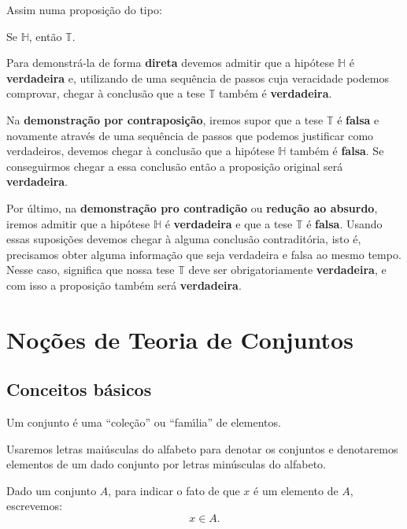 Assim numa proposi\c{c}\~ao do tipo:
\begin{center}
	Se $\mathbb{H}$, ent\~ao $\mathbb{T}$.
\end{center}

Para demonstr\'a-la de forma \textbf{direta} devemos admitir que a hip\'otese $\mathbb{H}$ \'e \textbf{verdadeira} e, utilizando de uma sequ\^encia de passos
cuja veracidade podemos comprovar, chegar \`a conclus\~ao que a tese $\mathbb{T}$ tamb\'em \'e \textbf{verdadeira}.

Na \textbf{demonstra\c{c}\~ao por contraposi\c{c}\~ao}, iremos supor que a tese $\mathbb{T}$ \'e \textbf{falsa} e novamente atrav\'es de uma
sequ\^encia de passos que podemos justificar como verdadeiros, devemos chegar \`a conclus\~ao que a hip\'otese $\mathbb{H}$ tamb\'em \'e
\textbf{falsa}. Se conseguirmos chegar a essa conclus\~ao ent\~ao a proposi\c{c}\~ao original ser\'a \textbf{verdadeira}.

Por \'ultimo, na \textbf{demonstra\c{c}\~ao pro contradi\c{c}\~ao} ou \textbf{redu\c{c}\~ao ao absurdo}, iremos admitir que a hip\'otese
$\mathbb{H}$ \'e \textbf{verdadeira} e que a tese $\mathbb{T}$ \'e \textbf{falsa}. Usando essas suposi\c{c}\~oes devemos chegar \`a alguma
conclus\~ao contradit\'oria, isto \'e, precisamos obter alguma informa\c{c}\~ao que seja verdadeira e falsa ao mesmo tempo. Nesse caso,
significa que nossa tese $\mathbb{T}$ deve ser obrigatoriamente \textbf{verdadeira}, e com isso a proposi\c{c}\~ao tamb\'em ser\'a
\textbf{verdadeira}.



\chapter{No{\c c}{\~o}es de Teoria de Conjuntos}
\section{Conceitos b{\'a}sicos}

Um conjunto {\'e} uma ``cole{\c c}{\~a}o'' ou ``fam{\'\i}lia'' de elementos.

Usaremos letras mai{\'u}sculas do alfabeto para denotar os conjuntos e denotaremos elementos de um dado conjunto por letras min{\'u}sculas do alfabeto.

Dado um conjunto $A$, para indicar o fato de que $x$ {\'e} um elemento de $A$, escrevemos:
\[
	x \in A.
\]

